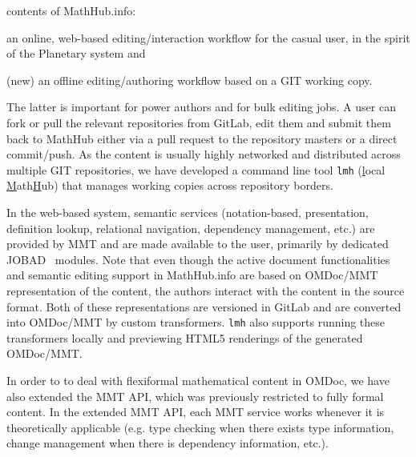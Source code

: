 \documentclass{llncs}
\def\omdoc{\textsf{OMDoc}\xspace}
\def\mmt{\textsf{MMT}\xspace}
\def\sys{\textsf{MathHub.info}\xspace}
\begin{document}
contents of \sys: 
\begin{inparaenum}[\em i\rm)]
\item an online, web-based editing/interaction workflow for the casual user, in the spirit
  of the Planetary system and
\item (new) an offline editing/authoring workflow based on a GIT working copy.
\end{inparaenum}
The latter is important for power authors and for bulk editing jobs. A user can fork or
pull the relevant repositories from GitLab, edit them and submit them back to MathHub
either via a pull request to the repository masters or a direct commit/push. As the
content is usually highly networked and distributed across multiple GIT repositories, we
have developed a command line tool \texttt{lmh} (\underline{l}ocal
\underline{M}ath\underline{H}ub) that manages working copies across repository
borders. 

In the web-based system, semantic services (notation-based, presentation, definition lookup,
relational navigation, dependency management, etc.) are provided by \mmt and are made available to the user, primarily by dedicated JOBAD~\cite{GLR:WebSvcActMathDoc09} modules.
Note that even though the active document functionalities and semantic editing
support in MathHub.info are based on \omdoc/\mmt representation of the content, the
authors interact with the content in the source format. Both of these representations are versioned in
GitLab and are converted into \omdoc/\mmt by custom transformers. \texttt{lmh} also
supports running these transformers locally and previewing HTML5 renderings of the
generated \omdoc/\mmt.

In order to to deal with flexiformal mathematical content in \omdoc, we have also extended the \mmt API, which was previously restricted to fully formal content. In the extended \mmt API, each \mmt service works whenever it is theoretically applicable (e.g. type checking when there exists type information, change management when there is dependency information, etc.).
\end{document}
